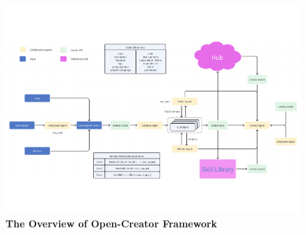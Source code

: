 \begin{figure}[t]
    \centering
    \includegraphics[width=1\textwidth]{./figures/creator_agents.pdf}
    \caption{\textbf{The Overview of Open-Creator Framework}}
    \label{fig:creator_agents}
\end{figure}